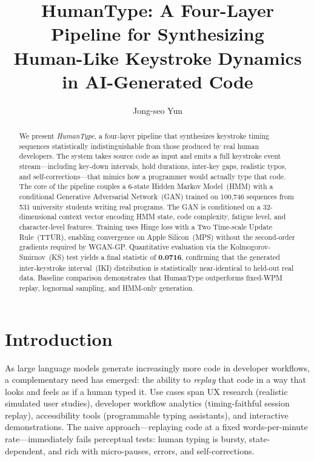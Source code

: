 \documentclass[sigconf,nonacm]{acmart}
\title{HumanType: A Four-Layer Pipeline for Synthesizing\\
       Human-Like Keystroke Dynamics in AI-Generated Code}
\author{Jong-seo Yun}
\affiliation{%
  \country{Republic of Korea}
}
\begin{document}
\begin{abstract}
We present \textit{HumanType}, a four-layer pipeline that synthesizes keystroke timing
sequences statistically indistinguishable from those produced by real human developers.
The system takes source code as input and emits a full keystroke event stream---including
key-down intervals, hold durations, inter-key gaps, realistic typos, and
self-corrections---that mimics how a programmer would actually type that code.
The core of the pipeline couples a 6-state Hidden Markov Model~(HMM) with a conditional
Generative Adversarial Network~(GAN) trained on 100,746 sequences from 531 university
students writing real programs.
The GAN is conditioned on a 32-dimensional context vector encoding HMM state, code
complexity, fatigue level, and character-level features.
Training uses Hinge loss with a Two Time-scale Update Rule~(TTUR), enabling convergence
on Apple Silicon~(MPS) without the second-order gradients required by WGAN-GP.
Quantitative evaluation via the Kolmogorov-Smirnov~(KS) test yields a final statistic
of \textbf{0.0716}, confirming that the generated inter-keystroke interval~(IKI)
distribution is statistically near-identical to held-out real data.
Baseline comparison demonstrates that HumanType outperforms fixed-WPM replay,
lognormal sampling, and HMM-only generation.
\end{abstract}


\maketitle

\section{Introduction}

As large language models generate increasingly more code in developer workflows, a
complementary need has emerged: the ability to \emph{replay} that code in a way that
looks and feels as if a human typed it.
Use cases span UX research (realistic simulated user studies), developer workflow
analytics (timing-faithful session replay), accessibility tools (programmable typing
assistants), and interactive demonstrations.
The naive approach---replaying code at a fixed words-per-minute rate---immediately fails
perceptual tests: human typing is bursty, state-dependent, and rich with micro-pauses,
errors, and self-corrections.
\end{document}

